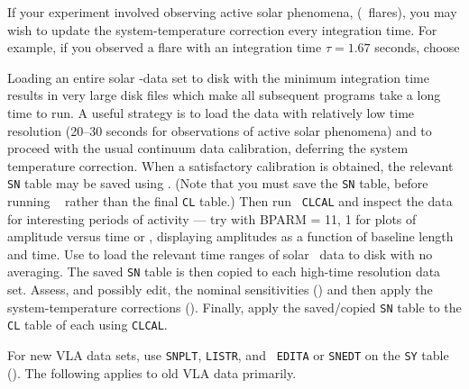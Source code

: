 If your experiment involved observing active solar phenomena,
(\eg\ flares), you may wish to update the system-temperature
correction every integration time.  For example, if you observed a
flare with an integration time $\tau = 1.67$ seconds, choose

     Loading an entire solar \uv-data set to disk with the minimum
integration time results in very large disk files which make all
subsequent programs take a long time to run.  A useful strategy is to
load the data with relatively low time resolution (20--30 seconds for
observations of active solar phenomena) and to proceed with the usual
continuum data calibration, deferring the system temperature
correction.  When a satisfactory calibration is obtained, the relevant
{\tt SN} table may be saved using \hbox{{\tt {}}}.  (Note
that you must save the {\tt SN} table, before running {\tt
{}} rather than the final {\tt CL} table.)  Then run {\tt
CLCAL} and inspect the data for interesting periods of activity ---
try {\tt {}} with {\us BPARM = 11, 1} for plots of amplitude
versus time or {\tt {}}, displaying amplitudes as a function
of baseline length and time.  Use {\tt {}} to load the
relevant time ranges of solar \uv\ data to disk with no averaging.
The saved {\tt SN} table is then copied to each high-time resolution
data set.  Assess, and possibly edit, the nominal sensitivities
() and then apply the system-temperature corrections
().  Finally, apply the saved/copied {\tt SN} table to
the {\tt CL} table of each using \hbox{{\tt CLCAL}}.


     For new VLA data sets, use {\tt SNPLT}, {\tt LISTR}, and {\tt
EDITA} or {\tt SNEDT} on the {\tt SY} table ().  The
following applies to old VLA data primarily.

